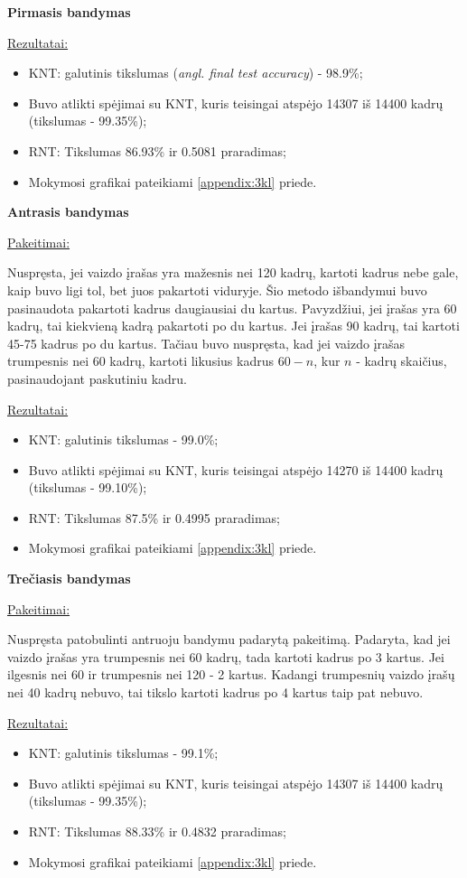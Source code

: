 \documentclass{VUMIFPSbakalaurinis}
\begin{document}
\bigbreak
\textbf{Pirmasis bandymas}

\underline{Rezultatai:}
\begin{itemize}
	\item KNT: galutinis tikslumas (\textit{angl. final test accuracy}) - 98.9\%;
	\item Buvo atlikti spėjimai su KNT, kuris teisingai atspėjo 14307 iš 14400 kadrų (tikslumas - 99.35\%);
	\item RNT: Tikslumas 86.93\% ir 0.5081 praradimas;
	\item Mokymosi grafikai pateikiami \ref{appendix:3kl} priede.
\end{itemize}

\bigbreak
\textbf{Antrasis bandymas}

\underline{Pakeitimai:}

Nuspręsta, jei vaizdo įrašas yra mažesnis nei 120 kadrų, kartoti kadrus nebe gale, kaip buvo ligi tol, bet juos pakartoti viduryje. Šio metodo išbandymui buvo pasinaudota pakartoti kadrus daugiausiai du kartus. Pavyzdžiui, jei įrašas yra 60 kadrų, tai kiekvieną kadrą pakartoti po du kartus. Jei įrašas 90 kadrų, tai kartoti 45-75 kadrus po du kartus. Tačiau buvo nuspręsta, kad jei vaizdo įrašas trumpesnis nei 60 kadrų, kartoti likusius kadrus $60-n$, kur $n$ - kadrų skaičius, pasinaudojant paskutiniu kadru.

\underline{Rezultatai:}
\begin{itemize}
	\item KNT: galutinis tikslumas - 99.0\%;
	\item Buvo atlikti spėjimai su KNT, kuris teisingai atspėjo 14270 iš 14400 kadrų (tikslumas - 99.10\%);
	\item RNT: Tikslumas 87.5\% ir 0.4995 praradimas;
	\item Mokymosi grafikai pateikiami \ref{appendix:3kl} priede.
\end{itemize}

\bigbreak
\textbf{Trečiasis bandymas}

\underline{Pakeitimai:}

Nuspręsta patobulinti antruoju bandymu padarytą pakeitimą. Padaryta, kad jei vaizdo įrašas yra trumpesnis nei 60 kadrų, tada kartoti kadrus po 3 kartus. Jei ilgesnis nei 60 ir trumpesnis nei 120 - 2 kartus. Kadangi trumpesnių vaizdo įrašų nei 40 kadrų nebuvo, tai tikslo kartoti kadrus po 4 kartus taip pat nebuvo.

\underline{Rezultatai:}
\begin{itemize}
	\item KNT: galutinis tikslumas - 99.1\%;
	\item Buvo atlikti spėjimai su KNT, kuris teisingai atspėjo 14307 iš 14400 kadrų (tikslumas - 99.35\%);
	\item RNT: Tikslumas 88.33\% ir 0.4832 praradimas;
	\item Mokymosi grafikai pateikiami \ref{appendix:3kl} priede.
\end{itemize}
\end{document}
